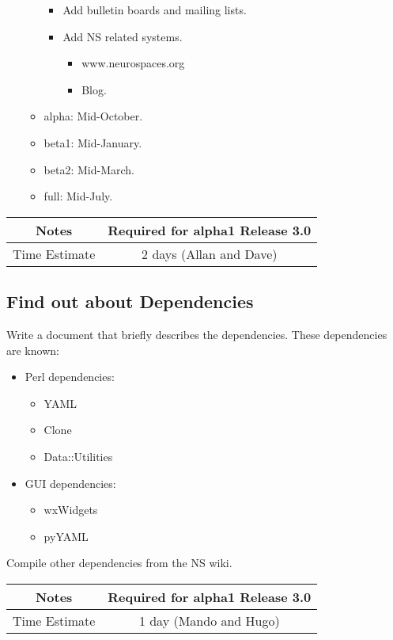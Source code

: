 \documentclass[12pt]{article}
\begin{document}
\begin{itemize}
\begin{itemize}
\begin{itemize}
    \item Add bulletin boards and mailing lists.
    \item Add NS related systems.
      \begin{itemize}
      \item www.neurospaces.org
      \item Blog.
      \end{itemize}
    \end{itemize}
  \item alpha: Mid-October.
  \item beta1: Mid-January.
  \item beta2: Mid-March.
  \item full: Mid-July.
  \end{itemize}
\end{itemize}

{
  \vspace{5mm}
  \centering
  \begin{tabular}{|c|c|}
    \hline
    Notes
    & Required for alpha1 Release 3.0 \\
    \hline
    Time Estimate
    & 2 days (Allan and Dave) \\
    \hline
  \end{tabular}
}


\subsection{Find out about Dependencies}

Write a document that briefly describes the dependencies.  These
dependencies are known:
\begin{itemize}
\item Perl dependencies:
  \begin{itemize}
  \item YAML
  \item Clone
  \item Data::Utilities
  \end{itemize}
\item GUI dependencies:
  \begin{itemize}
  \item wxWidgets
  \item pyYAML
  \end{itemize}
\end{itemize}

Compile other dependencies from the NS wiki.

{
  \vspace{5mm}
  \centering
  \begin{tabular}{|c|c|}
    \hline
    Notes
    & Required for alpha1 Release 3.0 \\
    \hline
    Time Estimate
    & 1 day (Mando and Hugo) \\
    \hline
  \end{tabular}
}
\end{document}
